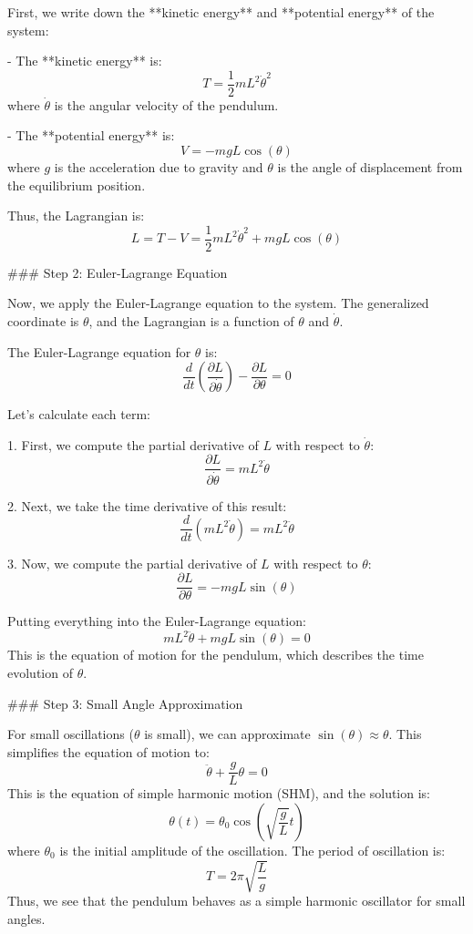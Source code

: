\documentclass{article}
\begin{document}
First, we write down the **kinetic energy** and **potential energy** of the system:

- The **kinetic energy** is:
  \[
  T = \frac{1}{2} m L^2 \dot{\theta}^2
  \]
  where \( \dot{\theta} \) is the angular velocity of the pendulum.

- The **potential energy** is:
  \[
  V = -mgL \cos(\theta)
  \]
  where \( g \) is the acceleration due to gravity and \( \theta \) is the angle of displacement from the equilibrium position.

Thus, the Lagrangian is:
\[
L = T - V = \frac{1}{2} m L^2 \dot{\theta}^2 + mgL \cos(\theta)
\]

### Step 2: Euler-Lagrange Equation

Now, we apply the Euler-Lagrange equation to the system. The generalized coordinate is \( \theta \), and the Lagrangian is a function of \( \theta \) and \( \dot{\theta} \).

The Euler-Lagrange equation for \( \theta \) is:
\[
\frac{d}{dt} \left( \frac{\partial L}{\partial \dot{\theta}} \right) - \frac{\partial L}{\partial \theta} = 0
\]

Let’s calculate each term:

1. First, we compute the partial derivative of \( L \) with respect to \( \dot{\theta} \):
   \[
   \frac{\partial L}{\partial \dot{\theta}} = m L^2 \dot{\theta}
   \]

2. Next, we take the time derivative of this result:
   \[
   \frac{d}{dt} \left( m L^2 \dot{\theta} \right) = m L^2 \ddot{\theta}
   \]

3. Now, we compute the partial derivative of \( L \) with respect to \( \theta \):
   \[
   \frac{\partial L}{\partial \theta} = -mgL \sin(\theta)
   \]

Putting everything into the Euler-Lagrange equation:
\[
m L^2 \ddot{\theta} + mgL \sin(\theta) = 0
\]
This is the equation of motion for the pendulum, which describes the time evolution of \( \theta \).

### Step 3: Small Angle Approximation

For small oscillations (\( \theta \) is small), we can approximate \( \sin(\theta) \approx \theta \). This simplifies the equation of motion to:
\[
\ddot{\theta} + \frac{g}{L} \theta = 0
\]
This is the equation of simple harmonic motion (SHM), and the solution is:
\[
\theta(t) = \theta_0 \cos\left( \sqrt{\frac{g}{L}} t \right)
\]
where \( \theta_0 \) is the initial amplitude of the oscillation. The period of oscillation is:
\[
T = 2\pi \sqrt{\frac{L}{g}}
\]
Thus, we see that the pendulum behaves as a simple harmonic oscillator for small angles.
\end{document}
